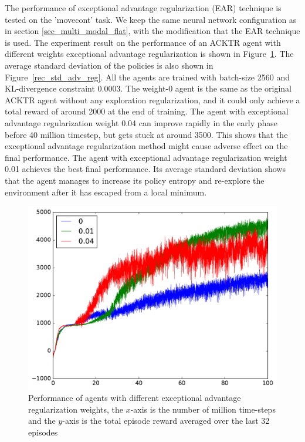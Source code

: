 The performance of exceptional advantage regularization (EAR) technique is tested on the 'movecont' task. We keep the same neural network configuration as in section \ref{sec_multi_modal_flat}, with the modification that the EAR technique is used.
The experiment result on the performance of an ACKTR agent with different weights exceptional advantage regularization is shown in Figure~\ref{rec_adv_reg}. The average standard deviation of the policies is also shown in Figure~\ref{rec_std_adv_reg}. All the agents are trained with batch-size 2560 and KL-divergence constraint 0.0003. The weight-0 agent is the same as the original ACKTR agent without any exploration regularization, and it could only achieve a total reward of around 2000 at the end of training. The agent with exceptional advantage regularization weight 0.04 can improve rapidly in the early phase before 40 million timestep, but gets stuck at around 3500. This shows that the exceptional advantage regularization method might cause adverse effect on the final performance. The agent with exceptional advantage regularization weight 0.01 achieves the best final performance. Its average standard deviation shows that the agent manages to increase its policy entropy and re-explore the environment after it has escaped from a local minimum.
\begin{figure}[!htbp]
	\includegraphics[width=\textwidth]{images/rec_adv_reg.pdf}
	\centering
	\caption{Performance of agents with different exceptional advantage regularization weights, the $x$-axis is the number of million time-steps and the $y$-axis is the total episode reward averaged over the last 32 episodes}\label{rec_adv_reg}
\end{figure}

